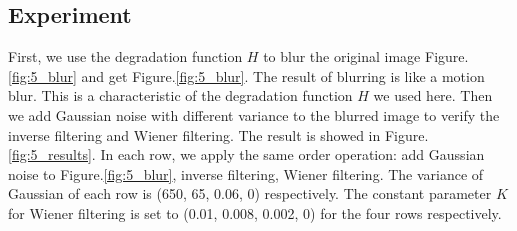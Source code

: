 \subsection{Experiment}
First, we use the degradation function $H$ to blur the original image Figure.\ref{fig:5_blur} and get Figure.\ref{fig:5_blur}. The result of blurring is like a motion blur. This is a characteristic of the degradation function $H$ we used here. Then we add Gaussian noise with different variance to the blurred image to verify the inverse filtering and Wiener filtering. The result is showed in Figure.\ref{fig:5_results}. In each row, we apply the same order operation: add Gaussian noise to Figure.\ref{fig:5_blur}, inverse filtering, Wiener filtering. The variance of Gaussian of each row is (650, 65, 0.06, 0) respectively. The constant parameter $K$ for Wiener filtering is set to (0.01, 0.008, 0.002, 0) for the four rows respectively.

